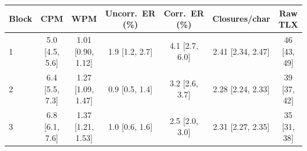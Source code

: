 \begin{tabular}{lcccccc}
\toprule
Block & CPM & WPM & Uncorr.\ ER (\%) & Corr.\ ER (\%) & Closures/char & Raw TLX \\
\midrule
1 & 5.0 [4.5, 5.6] & 1.01 [0.90, 1.12] & 1.9 [1.2, 2.7] & 4.1 [2.7, 6.0] & 2.41 [2.34, 2.47] & 46 [43, 49] \\
2 & 6.4 [5.5, 7.3] & 1.27 [1.09, 1.47] & 0.9 [0.5, 1.4] & 3.2 [2.6, 3.7] & 2.28 [2.24, 2.33] & 39 [37, 42] \\
3 & 6.8 [6.1, 7.6] & 1.37 [1.21, 1.53] & 1.0 [0.6, 1.6] & 2.5 [2.0, 3.0] & 2.31 [2.27, 2.35] & 35 [31, 38] \\
\bottomrule
\end{tabular}
